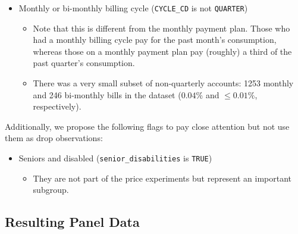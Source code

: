 \documentclass[11pt]{article}
\begin{document}
\begin{itemize}
\begin{itemize}
	\end{itemize}
	\item Monthly or bi-monthly billing cycle (\texttt{CYCLE\_CD} is not \texttt{QUARTER})
	\begin{itemize}
		\item Note that this is different from the monthly payment plan. Those who had a monthly billing cycle pay for the past month's consumption, whereas those on a monthly payment plan pay (roughly) a third of the past quarter's consumption.
		\item There was a very small subset of non-quarterly accounts: 1253 monthly and 246 bi-monthly bills in the dataset ($0.04\%$ and $\leq0.01\%$, respectively).
	\end{itemize}
\end{itemize}

Additionally, we propose the following flags to pay close attention but not use them as drop observations:
\begin{itemize}
	\item Seniors and disabled (\texttt{senior\_disabilities} is \texttt{TRUE})
	\begin{itemize}
		\item They are not part of the price experiments but represent an important subgroup.
	\end{itemize}
\end{itemize}

\subsection*{Resulting Panel Data}
\end{document}
